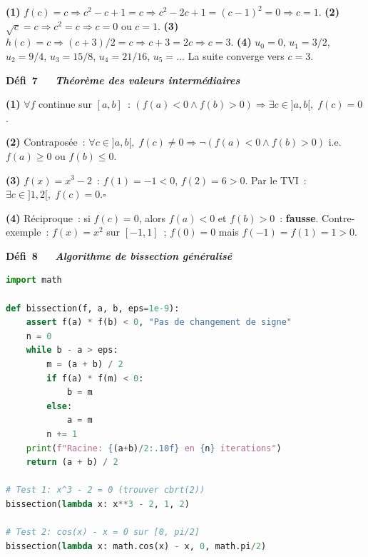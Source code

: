 \textbf{(1)} $f(c)=c\Rightarrow c^2-c+1=c\Rightarrow c^2-2c+1=(c-1)^2=0\Rightarrow c=1$.
\textbf{(2)} $\sqrt{c}=c\Rightarrow c^2=c\Rightarrow c=0$ ou $c=1$.
\textbf{(3)} $h(c)=c\Rightarrow(c+3)/2=c\Rightarrow c+3=2c\Rightarrow c=3$.
\textbf{(4)} $u_0=0$, $u_1=3/2$, $u_2=9/4$, $u_3=15/8$, $u_4=21/16$, $u_5=\ldots$
La suite converge vers $c=3$.

\noindent{}
{\color{BO}\bfseries\small D\'efi~7~\textendash\ \textit{\logiq\ Th\'eor\`eme des valeurs interm\'ediaires}}
\par\smallskip

\textbf{(1)} $\forall f$ continue sur $[a,b]$~:
$(f(a)<0\wedge f(b)>0)\Rightarrow\exists c\in]a,b[,\;f(c)=0$.

\textbf{(2)} Contrapos\'ee~: $\forall c\in]a,b[,\;f(c)\ne0\Rightarrow\neg(f(a)<0\wedge f(b)>0)$
i.e. $f(a)\geq0$ ou $f(b)\leq0$.

\textbf{(3)} $f(x)=x^3-2$~: $f(1)=-1<0$, $f(2)=6>0$. Par le TVI~:
$\exists c\in]1,2[,\;f(c)=0$.\hfill$\square$

\textbf{(4)} R\'eciproque~: \og si $f(c)=0$, alors $f(a)<0$ et $f(b)>0$\fg~: \textbf{fausse}.
Contre-exemple~: $f(x)=x^2$ sur $[-1,1]$~; $f(0)=0$ mais $f(-1)=f(1)=1>0$.

\noindent{}
{\color{BO}\bfseries\small D\'efi~8~\textendash\ \textit{\algo\ Algorithme de bissection g\'en\'eralis\'e \computer}}
\par\smallskip

\begin{lstlisting}[language=Python]
import math

def bissection(f, a, b, eps=1e-9):
    assert f(a) * f(b) < 0, "Pas de changement de signe"
    n = 0
    while b - a > eps:
        m = (a + b) / 2
        if f(a) * f(m) < 0:
            b = m
        else:
            a = m
        n += 1
    print(f"Racine: {(a+b)/2:.10f} en {n} iterations")
    return (a + b) / 2

# Test 1: x^3 - 2 = 0 (trouver cbrt(2))
bissection(lambda x: x**3 - 2, 1, 2)

# Test 2: cos(x) - x = 0 sur [0, pi/2]
bissection(lambda x: math.cos(x) - x, 0, math.pi/2)
\end{lstlisting}

